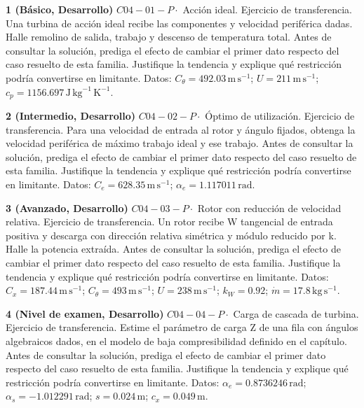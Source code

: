 \documentclass[10pt,openany]{book}
\begin{document}
\begin{tcolorbox}[title={Ejercicios propuestos}, studiumworked, breakable]

\noindent\textbf{1 (Básico, Desarrollo)}
\(C04-01-P \cdot\) Acción ideal. Ejercicio de transferencia. Una turbina de acción ideal recibe las componentes y velocidad periférica dadas. Halle remolino de salida, trabajo y descenso de temperatura total. Antes de consultar la solución, prediga el efecto de cambiar el primer dato respecto del caso resuelto de esta familia. Justifique la tendencia y explique qué restricción podría convertirse en limitante. Datos: \(C_\theta=492.03\, \mathrm{m}\,\mathrm{s}^{-1}\); \(U=211\, \mathrm{m}\,\mathrm{s}^{-1}\); \(c_p=1156.697\, \mathrm{J}\,\mathrm{kg}^{-1}\,\mathrm{K}^{-1}\).

\noindent\textbf{2 (Intermedio, Desarrollo)}
\(C04-02-P \cdot\) Óptimo de utilización. Ejercicio de transferencia. Para una velocidad de entrada al rotor y ángulo fijados, obtenga la velocidad periférica de máximo trabajo ideal y ese trabajo. Antes de consultar la solución, prediga el efecto de cambiar el primer dato respecto del caso resuelto de esta familia. Justifique la tendencia y explique qué restricción podría convertirse en limitante. Datos: \(C_e=628.35\, \mathrm{m}\,\mathrm{s}^{-1}\); \(\alpha_e=1.117011\, \mathrm{rad}\).

\noindent\textbf{3 (Avanzado, Desarrollo)}
\(C04-03-P \cdot\) Rotor con reducción de velocidad relativa. Ejercicio de transferencia. Un rotor recibe W tangencial de entrada positiva y descarga con dirección relativa simétrica y módulo reducido por k. Halle la potencia extraída. Antes de consultar la solución, prediga el efecto de cambiar el primer dato respecto del caso resuelto de esta familia. Justifique la tendencia y explique qué restricción podría convertirse en limitante. Datos: \(C_x=187.44\, \mathrm{m}\,\mathrm{s}^{-1}\); \(C_\theta=493\, \mathrm{m}\,\mathrm{s}^{-1}\); \(U=238\, \mathrm{m}\,\mathrm{s}^{-1}\); \(k_W=0.92\); \(\dot m=17.8\, \mathrm{kg}\,\mathrm{s}^{-1}\).

\noindent\textbf{4 (Nivel de examen, Desarrollo)}
\(C04-04-P \cdot\) Carga de cascada de turbina. Ejercicio de transferencia. Estime el parámetro de carga Z de una fila con ángulos algebraicos dados, en el modelo de baja compresibilidad definido en el capítulo. Antes de consultar la solución, prediga el efecto de cambiar el primer dato respecto del caso resuelto de esta familia. Justifique la tendencia y explique qué restricción podría convertirse en limitante. Datos: \(\alpha_e=0.8736246\, \mathrm{rad}\); \(\alpha_s=-1.012291\, \mathrm{rad}\); \(s=0.024\, \mathrm{m}\); \(c_x=0.049\, \mathrm{m}\).
\end{tcolorbox}
\end{document}
